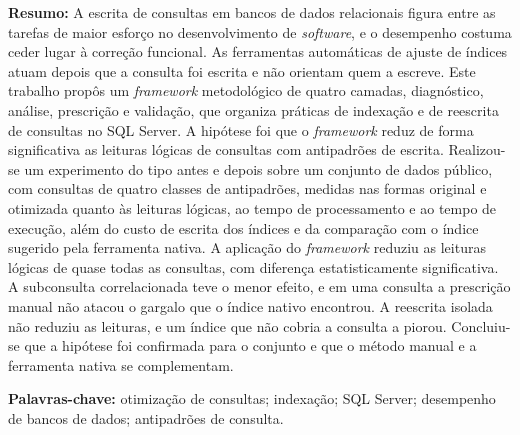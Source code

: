 %
%

\begingroup
\singlespacing

\noindent\textbf{Resumo:} A escrita de consultas em bancos de dados relacionais figura entre as tarefas de maior esforço no desenvolvimento de \textit{software}, e o desempenho costuma ceder lugar à correção funcional. As ferramentas automáticas de ajuste de índices atuam depois que a consulta foi escrita e não orientam quem a escreve. Este trabalho propôs um \textit{framework} metodológico de quatro camadas, diagnóstico, análise, prescrição e validação, que organiza práticas de indexação e de reescrita de consultas no SQL Server. A hipótese foi que o \textit{framework} reduz de forma significativa as leituras lógicas de consultas com antipadrões de escrita. Realizou-se um experimento do tipo antes e depois sobre um conjunto de dados público, com consultas de quatro classes de antipadrões, medidas nas formas original e otimizada quanto às leituras lógicas, ao tempo de processamento e ao tempo de execução, além do custo de escrita dos índices e da comparação com o índice sugerido pela ferramenta nativa. A aplicação do \textit{framework} reduziu as leituras lógicas de quase todas as consultas, com diferença estatisticamente significativa. A subconsulta correlacionada teve o menor efeito, e em uma consulta a prescrição manual não atacou o gargalo que o índice nativo encontrou. A reescrita isolada não reduziu as leituras, e um índice que não cobria a consulta a piorou. Concluiu-se que a hipótese foi confirmada para o conjunto e que o método manual e a ferramenta nativa se complementam.

\medskip
\noindent\textbf{Palavras-chave:} otimização de consultas; indexação; SQL Server; desempenho de bancos de dados; antipadrões de consulta.

